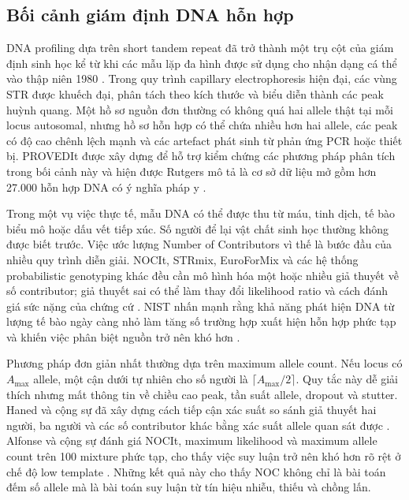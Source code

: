 \documentclass[12pt,a4paper]{article}
\begin{document}
\subsection{Bối cảnh giám định DNA hỗn hợp}

DNA profiling dựa trên short tandem repeat đã trở thành một trụ cột của giám định sinh học kể từ khi các mẫu lặp đa hình được sử dụng cho nhận dạng cá thể vào thập niên 1980 \cite{jeffreys1985}. Trong quy trình capillary electrophoresis hiện đại, các vùng STR được khuếch đại, phân tách theo kích thước và biểu diễn thành các peak huỳnh quang. Một hồ sơ nguồn đơn thường có không quá hai allele thật tại mỗi locus autosomal, nhưng hồ sơ hỗn hợp có thể chứa nhiều hơn hai allele, các peak có độ cao chênh lệch mạnh và các artefact phát sinh từ phản ứng PCR hoặc thiết bị. PROVEDIt được xây dựng để hỗ trợ kiểm chứng các phương pháp phân tích trong bối cảnh này và hiện được Rutgers mô tả là cơ sở dữ liệu mở gồm hơn 27.000 hỗn hợp DNA có ý nghĩa pháp y \cite{provedit2018,proveditweb}.

Trong một vụ việc thực tế, mẫu DNA có thể được thu từ máu, tinh dịch, tế bào biểu mô hoặc dấu vết tiếp xúc. Số người để lại vật chất sinh học thường không được biết trước. Việc ước lượng Number of Contributors vì thế là bước đầu của nhiều quy trình diễn giải. NOCIt, STRmix, EuroForMix và các hệ thống probabilistic genotyping khác đều cần mô hình hóa một hoặc nhiều giả thuyết về số contributor; giả thuyết sai có thể làm thay đổi likelihood ratio và cách đánh giá sức nặng của chứng cứ \cite{haned2011,bleka2016,bright2016,coble2019}. NIST nhấn mạnh rằng khả năng phát hiện DNA từ lượng tế bào ngày càng nhỏ làm tăng số trường hợp xuất hiện hỗn hợp phức tạp và khiến việc phân biệt nguồn trở nên khó hơn \cite{nist2024}.

Phương pháp đơn giản nhất thường dựa trên maximum allele count. Nếu locus có \(A_{\max}\) allele, một cận dưới tự nhiên cho số người là \(\lceil A_{\max}/2\rceil\). Quy tắc này dễ giải thích nhưng mất thông tin về chiều cao peak, tần suất allele, dropout và stutter. Haned và cộng sự đã xây dựng cách tiếp cận xác suất so sánh giả thuyết hai người, ba người và các số contributor khác bằng xác suất allele quan sát được \cite{haned2011}. Alfonse và cộng sự đánh giá NOCIt, maximum likelihood và maximum allele count trên 100 mixture phức tạp, cho thấy việc suy luận trở nên khó hơn rõ rệt ở chế độ low template \cite{alfonse2017}. Những kết quả này cho thấy NOC không chỉ là bài toán đếm số allele mà là bài toán suy luận từ tín hiệu nhiễu, thiếu và chồng lấn.
\end{document}
